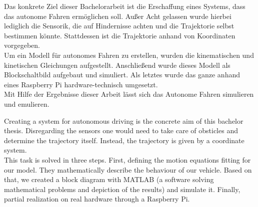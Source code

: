 
\label{sec:zusammenfassung}
Das konkrete Ziel dieser Bachelorarbeit ist die Erschaffung eines Systems, dass das autonome Fahren ermöglichen soll. Außer Acht gelassen wurde hierbei lediglich die Sensorik, die auf Hindernisse achten und die Trajektorie selbst bestimmen könnte. Stattdessen ist die Trajektorie anhand von Koordinaten vorgegeben. \\
Um ein Modell für autonomes Fahren zu erstellen, wurden die kinematischen und kinetischen Gleichungen aufgestellt. Anschließend wurde dieses Modell als Blockschaltbild aufgebaut und simuliert. Als letztes wurde das ganze anhand eines Raspberry Pi hardware-technisch umgesetzt. \\
Mit Hilfe der Ergebnisse dieser Arbeit lässt sich das Autonome Fahren simulieren und emulieren.

\label{abstract}
Creating a system for autonomous driving is the concrete aim of this bachelor thesis. Disregarding the sensors one would need to take care of obsticles and determine the trajectory itself. Instead, the trajectory is given by a coordinate system. \\
This task is solved in three steps. First, defining the motion equations fitting for our model. They mathematically describe the behaviour of our vehicle. Based on that, we created a block diagram with MATLAB (a software solving mathematical problems and depiction of the results) and simulate it. Finally, partial realization on real hardware through a Raspberry Pi. \newpage



